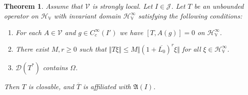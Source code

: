 \documentclass[12pt,b5paper,notitlepage]{article}
\theoremstyle{definition}
\theoremstyle{plain}
\newtheorem{thm}[df]{Theorem}
\newcommand{\fk}{\mathfrak}
\newcommand{\mc}{\mathcal}
\newcommand{\ovl}{\overline}
\newcommand{\Dom}{\scr{D}}
\newcommand{\scr}{\mathscr}
\newcommand{\HV}{\mathcal H_{\mathbb V}}
\newcommand{\MV}{\mathcal V}
\numberwithin{equation}{section}
\begin{document}
\subsection{}



\begin{thm}\label{lb106}
Assume that $\MV$ is strongly local. Let $I\in\mc J$. Let $T$ be an unbounded operator on $\HV$ with invariant domain $\HV^\infty$ satisfying the following conditions:
\begin{enumerate}[label=(\arabic*)]
\item For each $A\in\MV$ and $g\in C_c^\infty(I')$ we have $[T,A(g)]=0$ on $\HV^\infty$.
\item There exist $M,r\geq0$ such that $\Vert T\xi\Vert\leq M\Vert(1+\ovl{L_0})^r\xi\Vert$ for all $\xi\in\HV^\infty$. 
\item $\Dom(T^*)$ contains $\Omega$.
\end{enumerate}
Then $T$ is closable, and $\ovl T$ is affiliated with $\fk A(I)$.
\end{thm}
\end{document}
